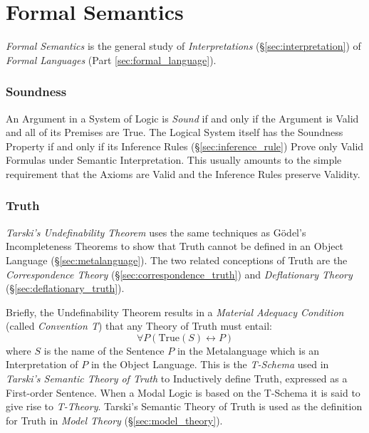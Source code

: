 \part{Formal Semantics}\label{sec:formal_semantics}

\emph{Formal Semantics} is the general study of \emph{Interpretations}
(\S\ref{sec:interpretation}) of \emph{Formal Languages} (Part
\ref{sec:formal_language}).



\section{Soundness}\label{sec:soundness}

An Argument in a System of Logic is \emph{Sound} if and only if the
Argument is Valid and all of its Premises are True. The Logical System
itself has the Soundness Property if and only if its Inference Rules
(\S\ref{sec:inference_rule}) Prove only Valid Formulas under
Semantic Interpretation. This usually amounts to the simple
requirement that the Axioms are Valid and the Inference Rules preserve
Validity.



\section{Truth}\label{sec:semantic_truth}

\emph{Tarski's Undefinability Theorem} \cite{tarski36} uses the same
techniques as G\"odel's Incompleteness Theorems to show that Truth
cannot be defined in an Object Language
(\S\ref{sec:metalanguage}). The two related conceptions of Truth are
the \emph{Correspondence Theory} (\S\ref{sec:correspondence_truth})
and \emph{Deflationary Theory} (\S\ref{sec:deflationary_truth}).

Briefly, the Undefinability Theorem results in a \emph{Material
  Adequacy Condition} (called \emph{Convention T}) that any Theory of
Truth must entail:
\[
    \forall P (\mathrm{True}(S) \leftrightarrow P)
\]
where $S$ is the name of the Sentence $P$ in the Metalanguage which is
an Interpretation of $P$ in the Object Language. This is the
\emph{T-Schema} used in \emph{Tarski's Semantic Theory of Truth} to
Inductively define Truth, expressed as a First-order Sentence. When a
Modal Logic is based on the T-Schema it is said to give rise to
\emph{T-Theory}. Tarski's Semantic Theory of Truth is used as the
definition for Truth in \emph{Model Theory}
(\S\ref{sec:model_theory}).

